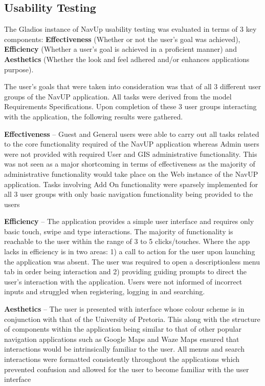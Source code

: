 \documentclass[english]{article}
\begin{document}
		\subsection{Usability Testing}\label{subsec:usabilty}  
		
		The Gladios instance of NavUp usability testing was evaluated in terms of 3 key components: \textbf{Effectiveness} (Whether or not the user’s goal was achieved), \textbf{Efficiency} (Whether a user’s goal is achieved in a proficient manner) and \textbf{Aesthetics} (Whether the look and feel adhered and/or enhances applications purpose). \newline
		
		The user’s goals that were taken into consideration was that of all 3 different user groups of the NavUP application. All tasks were derived from the model Requirements Specifications. Upon completion of these 3 user groups interacting with the application, the following results were gathered. \newline
		
		\textbf{Effectiveness} – Guest and General users were able to carry out all tasks related to the core functionality required of the NavUP application whereas Admin users were not provided with required User and GIS administrative functionality. This was not seen as a major shortcoming in terms of effectiveness as the majority of administrative functionality would take place on the Web instance of the NavUP application. Tasks involving Add On functionality were sparsely implemented for all 3 user groups with only basic navigation functionality being provided to the users \newline
		
		\textbf{Efficiency} – The application provides a simple user interface and requires only basic touch, swipe and type interactions. The majority of functionality is reachable to the user within the range of 3 to 5 clicks/touches. Where the app lacks in efficiency is in two areas:  1) a call to action for the user upon launching the application was absent. The user was required to open a descriptionless menu tab in order being interaction and 2) providing guiding prompts to direct the user’s interaction with the application. Users were not informed of incorrect inputs and struggled when registering, logging in and searching.\newline
		
		\textbf{Aesthetics} – The user is presented with interface whose colour scheme is in conjunction with that of the University of Pretoria. This along with the structure of components within the application being similar to that of other popular navigation applications such as Google Maps and Waze Maps ensured that interactions would be intrinsically familiar to the user. All menus and search interactions were formatted consistently throughout the applications which prevented confusion and allowed for the user to become familiar with the user interface \newline
		
\end{document}
